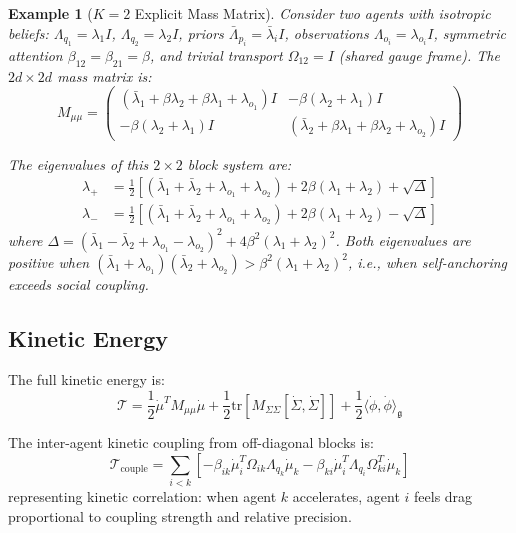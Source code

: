 \documentclass[11pt]{article}
\newtheorem{example}{Example}
\begin{document}
\begin{example}[$K=2$ Explicit Mass Matrix]
\label{ex:K2}
Consider two agents with isotropic beliefs: $\Lambda_{q_1} = \lambda_1 I$, $\Lambda_{q_2} = \lambda_2 I$, priors $\bar{\Lambda}_{p_i} = \bar{\lambda}_i I$, observations $\Lambda_{o_i} = \lambda_{o_i} I$, symmetric attention $\beta_{12} = \beta_{21} = \beta$, and trivial transport $\Omega_{12} = I$ (shared gauge frame). The $2d \times 2d$ mass matrix is:
\begin{equation}
M_{\mu\mu} = \begin{pmatrix}
(\bar{\lambda}_1 + \beta\lambda_2 + \beta\lambda_1 + \lambda_{o_1})I & -\beta(\lambda_2 + \lambda_1)I \\
-\beta(\lambda_2 + \lambda_1)I & (\bar{\lambda}_2 + \beta\lambda_1 + \beta\lambda_2 + \lambda_{o_2})I
\end{pmatrix}
\end{equation}

The eigenvalues of this $2 \times 2$ block system are:
\begin{align}
\lambda_+ &= \frac{1}{2}\left[(\bar{\lambda}_1 + \bar{\lambda}_2 + \lambda_{o_1} + \lambda_{o_2}) + 2\beta(\lambda_1 + \lambda_2) + \sqrt{\Delta}\right] \\
\lambda_- &= \frac{1}{2}\left[(\bar{\lambda}_1 + \bar{\lambda}_2 + \lambda_{o_1} + \lambda_{o_2}) + 2\beta(\lambda_1 + \lambda_2) - \sqrt{\Delta}\right]
\end{align}
where $\Delta = (\bar{\lambda}_1 - \bar{\lambda}_2 + \lambda_{o_1} - \lambda_{o_2})^2 + 4\beta^2(\lambda_1 + \lambda_2)^2$. Both eigenvalues are positive when $(\bar{\lambda}_1 + \lambda_{o_1})(\bar{\lambda}_2 + \lambda_{o_2}) > \beta^2(\lambda_1 + \lambda_2)^2$, i.e., when self-anchoring exceeds social coupling.
\end{example}

\subsection{Kinetic Energy}

The full kinetic energy is:
\begin{equation}
\mathcal{T} = \frac{1}{2}\dot{\mu}^T M_{\mu\mu}\dot{\mu} + \frac{1}{2}\mathrm{tr}[M_{\Sigma\Sigma}[\dot{\Sigma}, \dot{\Sigma}]] + \frac{1}{2}\langle\dot{\phi}, \dot{\phi}\rangle_{\mathfrak{g}}
\end{equation}

The inter-agent kinetic coupling from off-diagonal blocks is:
\begin{equation}
\mathcal{T}_{\mathrm{couple}} = \sum_{i < k}\left[-\beta_{ik}\dot{\mu}_i^T\Omega_{ik}\Lambda_{q_k}\dot{\mu}_k - \beta_{ki}\dot{\mu}_i^T\Lambda_{q_i}\Omega_{ki}^T\dot{\mu}_k\right]
\end{equation}
representing kinetic correlation: when agent $k$ accelerates, agent $i$ feels drag proportional to coupling strength and relative precision.
\end{document}
